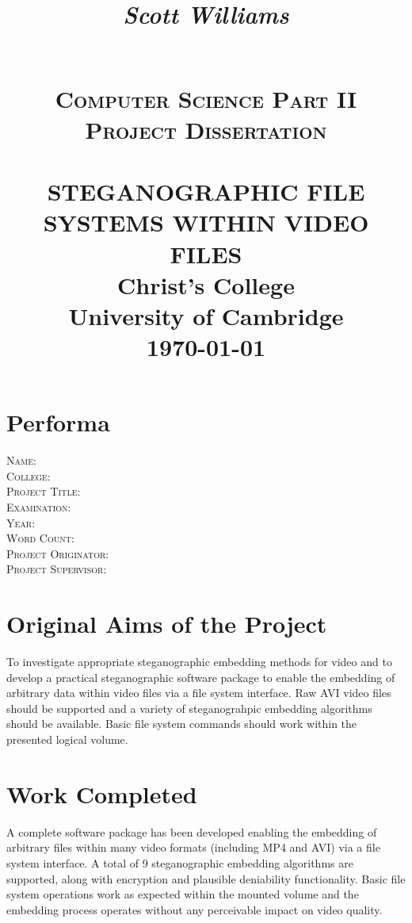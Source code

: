 \documentclass[paper=a4, fontsize=11pt,twoside]{scrartcl}    %
\title{    \begin{flushright}
				\LARGE{\textit{Scott Williams}}
			\end{flushright}
			~\\[2.0cm]			
			\normalsize \textsc{Computer Science Part II Project Dissertation}     %
             \\[2.0cm]                                %
            \HRule{0.5pt} \\                        %
            \LARGE \textbf{\uppercase{Steganographic file systems within video files}}    %
            \HRule{2pt} \\ [30pt]        %
            \normalsize Christ's College\\[5pt]University of Cambridge\\[25pt]           
            \normalsize \today            %
        }
\makeatletter
\def\printtitle{%
    {\centering \@title\par}}
\def\printauthor{%
    {\large \@author}}
\makeatother
\begin{document}
\thispagestyle{empty}        %

\printtitle                    %
      \vfill
\printauthor                %
\newpage
\setcounter{page}{1}        %
\section*{Performa}
\textsc{Name}: \\
\textsc{College}: \\
\textsc{Project Title}: \\
\textsc{Examination}: \\
\textsc{Year}: \\
\textsc{Word Count}: \\
\textsc{Project Originator}: \\
\textsc{Project Supervisor}: \\

\section*{Original Aims of the Project}
To investigate appropriate steganographic embedding methods for video and to develop a practical steganographic software package to enable the embedding of arbitrary data within video files via a file system interface. Raw AVI video files should be supported and a variety of steganograhpic embedding algorithms should be available. Basic file system commands should work within the presented logical volume.

\section*{Work Completed}
A complete software package has been developed enabling the embedding of arbitrary files within many video formats (including MP4 and AVI) via a file system interface. A total of 9 steganographic embedding algorithms are supported, along with encryption and plausible deniability functionality. Basic file system operations work as expected within the mounted volume and the embedding process operates without any perceivable impact on video quality.
\end{document}
